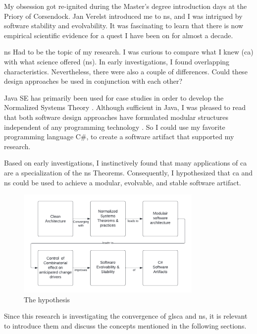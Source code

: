 My obsession got re-ignited during the Master's degree introduction days at the Priory of
Corsendock. Jan Verelst introduced me to \gls{ns}, and I was intrigued by software
stability and evolvability. It was fascinating to learn that there is now empirical
scientific evidence for a quest I have been on for almost a decade. 

\gls{ns} Had to be the topic of my research. I was curious to compare what I knew
(\gls{ca}) with what science offered (\gls{ns}). In early investigations, I found
overlapping characteristics. Nevertheless, there were also a couple of differences. Could
these design approaches be used in conjunction with each other?

Java SE has primarily been used for case studies in order to develop the Normalized
Systems Theory \parencite{oorts_building_2014, de_bruyn_enabling_2018}. Although
sufficient in Java, I was pleased to read that both software design approaches have
formulated modular structures independent of any programming technology
\parencite{mannaert_normalized_2009,robert_c_martin_clean_2018}. So I could use my
favorite programming language C\#, to create a software artifact that supported my
research. 

Based on early investigations, I instinctively found that many applications of \gls{ca}
are a specialization of the \gls{ns} Theorems. Consequently, I hypothesized that \gls{ca}
and \gls{ns} could be used to achieve a modular, evolvable, and stable software artifact.

\begin{figure}[H]
    \centering
    \includegraphics[width=0.8\textwidth]{figures/hypothesis.pdf}
    \caption[The hypothesis]{The hypothesis}
    \label{fig_hypothesis}
\end{figure}

Since this research is investigating the convergence of gls{ca} and \gls{ns}, it is
relevant to introduce them and discuss the concepts mentioned in the following sections.




